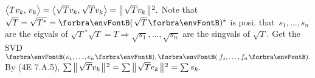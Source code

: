 
$\big\langle{}Tv_k,\;\!v_k{}\big\rangle=\big\langle{}\sqrt{T}v_k,\:\!\sqrt{T}v_k{}\big\rangle=\big\Vert\hspace{1pt}{}\sqrt{T}v_k{}\hspace{1pt}\big\Vert{\hspace{0.5pt}}{^2}.$ Note that $\sqrt{T}=\sqrt{T^*}=\Par{\sqrt{T}}{^*}$ is posi.\parSol{}
\NOTICE that \,$s_1,\dots,s_n$ are the eigvals of $\sqrt{T}{^*}\sqrt{T}=T\Rightarrow\sqrt{s_1},\dots,\sqrt{s_n}$ are the singvals of $\sqrt{T}.$\parSol{}
Get the SVD $\Par{e_1,\dots,e_n},\Par{\,f_1,\dots,f_n}.$ By (4E 7.A.5), $\sum\big\Vert\hspace{1pt}{}\sqrt{T}v_k{}\hspace{1pt}\big\Vert{\hspace{0.5pt}}{^2}=\sum\big\Vert\hspace{1pt}{}\sqrt{T}e_k{}\hspace{1pt}\big\Vert{\hspace{0.5pt}}{^2}=\sum s_k.$\PfEnd
\SepLine


